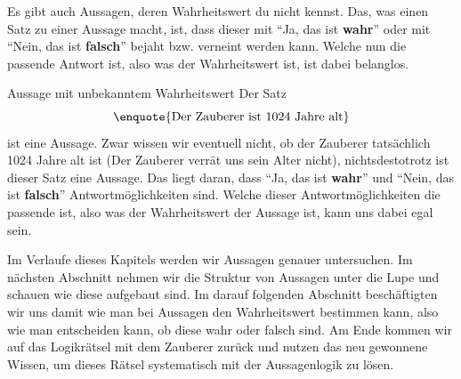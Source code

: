 \documentclass[../../main.tex]{subfiles}
\begin{document}
    Es gibt auch Aussagen, deren Wahrheitswert du nicht kennst. 
    Das, was einen Satz zu einer Aussage macht, 
    ist, dass dieser mit \enquote{Ja, das ist \textbf{wahr}} oder 
    mit \enquote{Nein, das ist \textbf{falsch}} bejaht bzw. verneint werden kann. 
    Welche nun die passende Antwort ist, also was der Wahrheitswert ist, ist dabei belanglos.
   
   \begin{example}{Aussage mit unbekanntem Wahrheitswert}
        Der Satz 
        \[\textrm{\enquote{Der Zauberer ist 1024 Jahre alt}}\]
        ist eine Aussage. Zwar wissen wir eventuell nicht, ob der Zauberer tatsächlich 1024 
        Jahre alt ist (Der Zauberer verrät uns sein Alter nicht), nichtsdestotrotz ist 
        dieser Satz eine Aussage. Das liegt daran, dass 
        \enquote{Ja, das ist \textbf{wahr}} und  \enquote{Nein, das ist \textbf{falsch}} 
        Antwortmöglichkeiten sind. Welche dieser Antwortmöglichkeiten die passende ist, also 
        was der Wahrheitswert der Aussage ist, kann uns dabei egal sein.
   \end{example}

    Im Verlaufe dieses Kapitels werden wir Aussagen genauer untersuchen. Im nächsten 
    Abschnitt nehmen wir die Struktur von Aussagen unter die Lupe und schauen wie 
    diese aufgebaut sind. Im darauf folgenden Abschnitt beschäftigten wir uns damit 
    wie man bei Aussagen den Wahrheitswert bestimmen kann, 
    also wie man entscheiden kann, ob diese wahr oder falsch sind. Am Ende 
    kommen wir auf das Logikrätsel mit dem Zauberer zurück und nutzen das neu 
    gewonnene Wissen, um dieses Rätsel systematisch mit der Aussagenlogik zu lösen.

    
        
\end{document}
